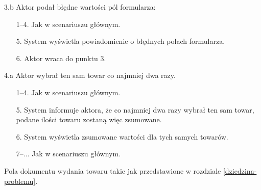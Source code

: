 \begin{usecase}
{\begin{enumerate}
      \end{enumerate}
    \item [3.b] Aktor podał błędne wartości pól formularza:
      \begin{enumerate}
        \item[1--4.] Jak w scenariuszu głównym.
        \item[5.] System wyświetla powiadomienie o błędnych polach formularza.
        \item[6.] Aktor wraca do punktu 3.
      \end{enumerate}
     \item[4.a] Aktor wybrał ten sam towar co najmniej dwa razy.
       \begin{enumerate}
       \item[1--4.] Jak w scenariuszu głównym.
       \item[5.] System informuje aktora, że co najmniej dwa razy wybrał ten sam towar, podane ilości towaru zostaną więc zsumowane.
       \item[6.] System wyświetla zsumowane wartości dla tych samych towarów.
       \item[7--...] Jak w scenariuszu głównym.
       \end{enumerate}
  }
   {
    Pola dokumentu wydania towaru takie jak przedstawione w rozdziale \ref{dziedzina-problemu}.
  }
\end{usecase}

